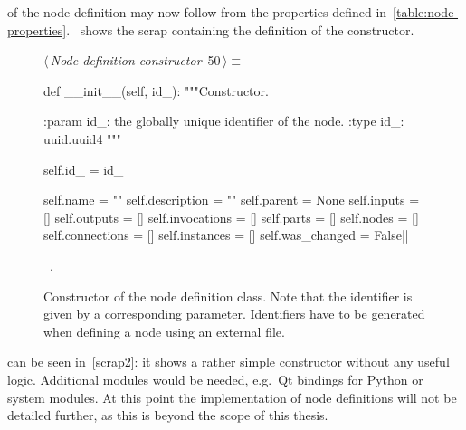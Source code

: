 \documentclass[%
    a4paper,    %
    justified,  %
    nobib,      %
    openany     %
]{tufte-book}
\makeatletter
\renewcommand{\label}[1]{\@tufte@label{##1}}%
\makeatother
\begin{document}
 of the node definition may now follow
from the properties defined
in~\autoref{table:node-properties}.~ shows the
scrap containing the definition of the constructor.

\begin{figure}[!htbp]
  \begin{flushleft} \small
\begin{minipage}{\linewidth}\label{scrap2}\raggedright\small
{} $\langle\,${\itshape Node definition constructor}\nobreak\ {\footnotesize {50}}$\,\rangle\equiv$
\vspace{-1ex}
\begin{pythoncode}
def __init__(self, id_):
    """Constructor.

    :param id_: the globally unique identifier of the node.
    :type  id_: uuid.uuid4
    """

    self.id_         = id_

    self.name        = ""
    self.description = ""
    self.parent      = None
    self.inputs      = []
    self.outputs     = []
    self.invocations = []
    self.parts       = []
    self.nodes       = []
    self.connections = []
    self.instances   = []
    self.was_changed = False|\NWsep|
\end{pythoncode}
\vspace{1.5ex}
\footnotesize
\begin{list}{}{\setlength{\itemsep}{-\parsep}\setlength{\itemindent}{-\leftmargin}}
\item \NWtxtMacroRefIn\ .

\item{}
\end{list}
\end{minipage}\vspace{4ex}
\end{flushleft}
\caption{Constructor of the node definition class. Note that the
    identifier is given by a corresponding parameter. Identifiers have to be
    generated when defining a node using an external file.}
\end{figure}

 can be seen
in~\cref{scrap2}: it shows a rather simple constructor without
any useful logic. Additional modules would be needed, e.g.\ Qt bindings for
Python or system modules. At this point the implementation of node definitions
will not be detailed further, as this is beyond the scope of this thesis.
\end{document}
